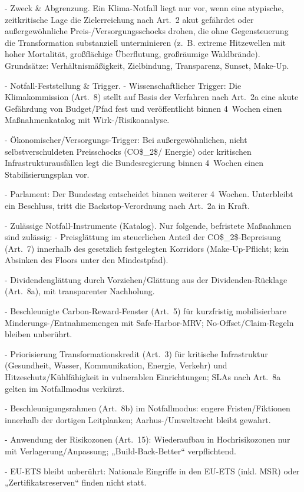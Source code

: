 \documentclass[12pt,a4paper]{scrartcl}
\begin{document}
- Zweck \& Abgrenzung. Ein Klima-Notfall liegt nur vor, wenn eine atypische, zeitkritische Lage die Zielerreichung nach Art. 2 akut gefährdet oder außergewöhnliche Preis-/Versorgungsschocks drohen, die ohne Gegensteuerung die Transformation substanziell unterminieren (z. B. extreme Hitzewellen mit hoher Mortalität, großflächige Überflutung, großräumige Waldbrände). Grundsätze: Verhältnismäßigkeit, Zielbindung, Transparenz, Sunset, Make-Up.

- Notfall-Feststellung \& Trigger.
- Wissenschaftlicher Trigger: Die Klimakommission (Art. 8) stellt auf Basis der Verfahren nach Art. 2a eine akute Gefährdung von Budget/Pfad fest und veröffentlicht binnen 4 Wochen einen Maßnahmenkatalog mit Wirk-/Risikoanalyse.

- Ökonomischer/Versorgungs-Trigger: Bei außergewöhnlichen, nicht selbstverschuldeten Preisschocks (CO\$\_2\$/ Energie) oder kritischen Infrastrukturausfällen legt die Bundesregierung binnen 4 Wochen einen Stabilisierungsplan vor.

- Parlament: Der Bundestag entscheidet binnen weiterer 4 Wochen. Unterbleibt ein Beschluss, tritt die Backstop-Verordnung nach Art. 2a in Kraft.

- Zulässige Notfall-Instrumente (Katalog). Nur folgende, befristete Maßnahmen sind zulässig:
- Preisglättung im steuerlichen Anteil der CO\$\_2\$-Bepreisung (Art. 7) innerhalb des gesetzlich festgelegten Korridors (Make-Up-Pflicht; kein Absinken des Floors unter den Mindestpfad).

- Dividendenglättung durch Vorziehen/Glättung aus der Dividenden-Rücklage (Art. 8a), mit transparenter Nachholung.

- Beschleunigte Carbon-Reward-Fenster (Art. 5) für kurzfristig mobilisierbare Minderungs-/Entnahmemengen mit Safe-Harbor-MRV; No-Offset/Claim-Regeln bleiben unberührt.

- Priorisierung Transformationskredit (Art. 3) für kritische Infrastruktur (Gesundheit, Wasser, Kommunikation, Energie, Verkehr) und Hitzeschutz/Kühlfähigkeit in vulnerablen Einrichtungen; SLAs nach Art. 8a gelten im Notfallmodus verkürzt.

- Beschleunigungsrahmen (Art. 8b) im Notfallmodus: engere Fristen/Fiktionen innerhalb der dortigen Leitplanken; Aarhus-/Umweltrecht bleibt gewahrt.

- Anwendung der Risikozonen (Art. 15): Wiederaufbau in Hochrisikozonen nur mit Verlagerung/Anpassung; „Build-Back-Better“ verpflichtend.

- EU-ETS bleibt unberührt: Nationale Eingriffe in den EU-ETS (inkl. MSR) oder „Zertifikatsreserven“ finden nicht statt.
\end{document}
